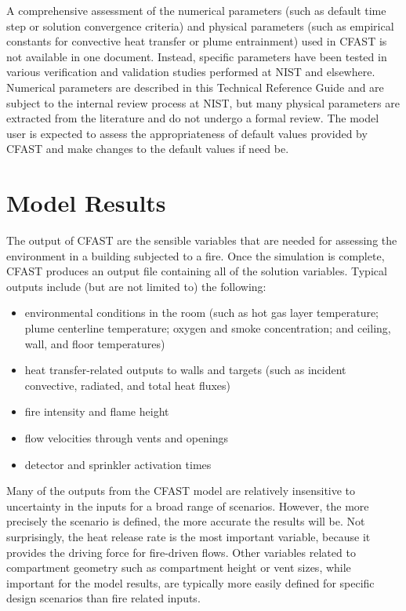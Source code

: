 A comprehensive assessment of the numerical parameters (such as default time step or solution convergence criteria) and physical parameters (such as empirical constants for convective heat transfer or plume entrainment) used in CFAST is not available in one document. Instead, specific parameters have been tested in various verification and validation studies performed at NIST and elsewhere. Numerical parameters are described in this Technical Reference Guide and are subject to the internal review process at NIST, but many physical parameters are extracted from the literature and do not undergo a formal review. The model user is expected to assess the appropriateness of default values provided by CFAST and make changes to the default values if need be.



\section{Model Results}

The output of CFAST are the sensible variables that are needed for assessing the environment in a building subjected to a fire. Once the simulation is complete, CFAST produces an output file containing all of the solution variables.  Typical outputs include (but are not limited to) the following:
\begin{itemize}
\item environmental conditions in the room (such as hot gas layer temperature; plume centerline temperature; oxygen and smoke concentration; and ceiling, wall, and floor temperatures)
\item heat transfer-related outputs to walls and targets (such as incident convective, radiated, and total heat fluxes)
\item fire intensity and flame height
\item flow velocities through vents and openings
\item detector and sprinkler activation times
\end{itemize}

Many of the outputs from the CFAST model are relatively insensitive to uncertainty in the inputs for a broad range of scenarios. However, the more precisely the scenario is defined, the more accurate the results will be. Not surprisingly, the heat release rate is the most important variable, because it provides the driving force for fire-driven flows. Other variables related to compartment geometry such as compartment height or vent sizes, while important for the model results, are typically more easily defined for specific design scenarios than fire related inputs.

